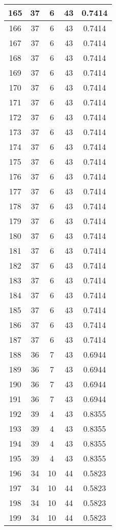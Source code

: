 \documentclass[letterpaper, 12pt]{article}
\begin{document}
\begin{longtable}{|c|c|c|c|c|}
\hline
165 & 37 & 6 & 43 & 0.7414 \\
\hline
166 & 37 & 6 & 43 & 0.7414 \\
\hline
167 & 37 & 6 & 43 & 0.7414 \\
\hline
168 & 37 & 6 & 43 & 0.7414 \\
\hline
169 & 37 & 6 & 43 & 0.7414 \\
\hline
170 & 37 & 6 & 43 & 0.7414 \\
\hline
171 & 37 & 6 & 43 & 0.7414 \\
\hline
172 & 37 & 6 & 43 & 0.7414 \\
\hline
173 & 37 & 6 & 43 & 0.7414 \\
\hline
174 & 37 & 6 & 43 & 0.7414 \\
\hline
175 & 37 & 6 & 43 & 0.7414 \\
\hline
176 & 37 & 6 & 43 & 0.7414 \\
\hline
177 & 37 & 6 & 43 & 0.7414 \\
\hline
178 & 37 & 6 & 43 & 0.7414 \\
\hline
179 & 37 & 6 & 43 & 0.7414 \\
\hline
180 & 37 & 6 & 43 & 0.7414 \\
\hline
181 & 37 & 6 & 43 & 0.7414 \\
\hline
182 & 37 & 6 & 43 & 0.7414 \\
\hline
183 & 37 & 6 & 43 & 0.7414 \\
\hline
184 & 37 & 6 & 43 & 0.7414 \\
\hline
185 & 37 & 6 & 43 & 0.7414 \\
\hline
186 & 37 & 6 & 43 & 0.7414 \\
\hline
187 & 37 & 6 & 43 & 0.7414 \\
\hline
188 & 36 & 7 & 43 & 0.6944 \\
\hline
189 & 36 & 7 & 43 & 0.6944 \\
\hline
190 & 36 & 7 & 43 & 0.6944 \\
\hline
191 & 36 & 7 & 43 & 0.6944 \\
\hline
192 & 39 & 4 & 43 & 0.8355 \\
\hline
193 & 39 & 4 & 43 & 0.8355 \\
\hline
194 & 39 & 4 & 43 & 0.8355 \\
\hline
195 & 39 & 4 & 43 & 0.8355 \\
\hline
196 & 34 & 10 & 44 & 0.5823 \\
\hline
197 & 34 & 10 & 44 & 0.5823 \\
\hline
198 & 34 & 10 & 44 & 0.5823 \\
\hline
199 & 34 & 10 & 44 & 0.5823 \\
\hline
\end{longtable}
\end{document}
